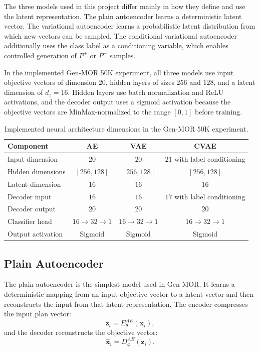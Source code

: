The three models used in this project differ mainly in how they define and use the latent representation. The plain autoencoder learns a deterministic latent vector. The variational autoencoder learns a probabilistic latent distribution from which new vectors can be sampled. The conditional variational autoencoder additionally uses the class label as a conditioning variable, which enables controlled generation of $P^{+}$ or $P^{-}$ samples.

In the implemented Gen-MOR 50K experiment, all three models use input objective vectors of dimension $20$, hidden layers of sizes $256$ and $128$, and a latent dimension of $d_z=16$. Hidden layers use batch normalization and ReLU activations, and the decoder output uses a sigmoid activation because the objective vectors are MinMax-normalized to the range $[0,1]$ before training.

%
\begin{table}[H]
\centering
\caption{Implemented neural architecture dimensions in the Gen-MOR 50K experiment.}
\label{tab:implemented_architecture}
\begin{tabular}{|l|c|c|c|}
\hline
\textbf{Component} & \textbf{AE} & \textbf{VAE} & \textbf{CVAE} \\
\hline
Input dimension & $20$ & $20$ & $21$ with label conditioning \\
Hidden dimensions & $[256,128]$ & $[256,128]$ & $[256,128]$ \\
Latent dimension & $16$ & $16$ & $16$ \\
Decoder input & $16$ & $16$ & $17$ with label conditioning \\
Decoder output & $20$ & $20$ & $20$ \\
Classifier head & $16 \rightarrow 32 \rightarrow 1$ & $16 \rightarrow 32 \rightarrow 1$ & $16 \rightarrow 32 \rightarrow 1$ \\
Output activation & Sigmoid & Sigmoid & Sigmoid \\
\hline
\end{tabular}
\end{table}
%
\subsection{Plain Autoencoder}
\label{subsec:plain_autoencoder}

The plain autoencoder is the simplest model used in Gen-MOR. It learns a deterministic mapping from an input objective vector to a latent vector and then reconstructs the input from that latent representation. The encoder compresses the input plan vector:
\begin{equation}
    \mathbf{z}_i = E_{\theta}^{AE}(\mathbf{x}_i),
    \label{eq:ae_encoder}
\end{equation}
and the decoder reconstructs the objective vector:
\begin{equation}
    \hat{\mathbf{x}}_i = D_{\phi}^{AE}(\mathbf{z}_i).
    \label{eq:ae_decoder}
\end{equation}

